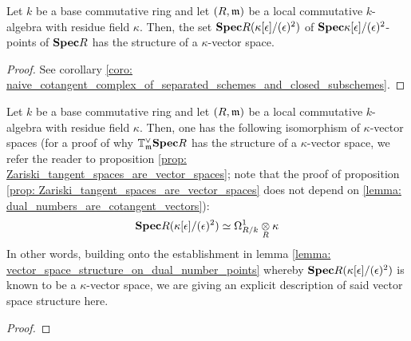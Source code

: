             \begin{lemma} \label{lemma: vector_space_structure_on_dual_number_points}
                Let $k$ be a base commutative ring and let $(R, \mathfrak{m})$ be a local commutative $k$-algebra with residue field $\kappa$. Then, the set $\mathbf{Spec} R(\kappa[\epsilon]/(\epsilon)^2)$ of $\mathbf{Spec} \kappa[\epsilon]/(\epsilon)^2$-points of $\mathbf{Spec} R$ has the structure of a $\kappa$-vector space. 
            \end{lemma}
                \begin{proof}
                    See corollary \ref{coro: naive_cotangent_complex_of_separated_schemes_and_closed_subschemes}.
                \end{proof}
            
            \begin{lemma} \label{lemma: dual_numbers_are_cotangent_vectors} 
                Let $k$ be a base commutative ring and let $(R, \mathfrak{m})$ be a local commutative $k$-algebra with residue field $\kappa$. Then, one has the following isomorphism of $\kappa$-vector spaces (for a proof of why $\mathbb{T}^{\vee}_{\mathfrak{m}}\mathbf{Spec} R$ has the structure of a $\kappa$-vector space, we refer the reader to proposition \ref{prop: Zariski_tangent_spaces_are_vector_spaces}; note that the proof of proposition \ref{prop: Zariski_tangent_spaces_are_vector_spaces} does not depend on \ref{lemma: dual_numbers_are_cotangent_vectors}):
                    $$\Spec R(\kappa[\e]/(\e)^2) \cong \Omega^1_{R/k} \tensor_R \kappa$$
                In other words, building onto the establishment in lemma \ref{lemma: vector_space_structure_on_dual_number_points} whereby $\mathbf{Spec} R(\kappa[\epsilon]/(\epsilon)^2)$ is known to be a $\kappa$-vector space, we are giving an explicit description of said vector space structure here.
            \end{lemma}
                \begin{proof}
                    
                \end{proof}
            
